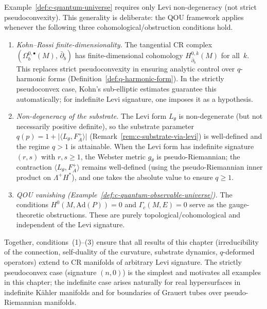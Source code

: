 \begin{remark}
\label{rem:levi-generalisation}
Example~\ref{def:c-quantum-universe} requires only Levi non-degeneracy
(not strict pseudoconvexity).  This generality is deliberate: the QOU
framework applies whenever the following three cohomological/obstruction
conditions hold.

\begin{enumerate}
  \item \emph{Kohn--Rossi finite-dimensionality.}\;
        The tangential CR complex
        $(\Omega^{0,\bullet}_b(M),\, \bar\partial_b)$ has
        finite-dimensional cohomology
        $H^{0,k}_{\bar\partial_b}(M)$ for all~$k$.  This replaces
        strict pseudoconvexity in ensuring analytic control over
        $q$-harmonic forms (Definition~\ref{def:q-harmonic-form}).
        In the strictly pseudoconvex case, Kohn's sub-elliptic
        estimates guarantee this automatically; for indefinite
        Levi signature, one imposes it as a hypothesis.
  \item \emph{Non-degeneracy of the substrate.}\;
        The Levi form $L_\theta$ is non-degenerate (but not necessarily
        positive definite), so the substrate parameter
        $q(p) = 1 + \lvert\langle L_\theta, F_A^+\rangle\rvert$
        (Remark~\ref{rem:c-substrate-via-levi}) is well-defined and
        the regime $q > 1$ is attainable.  When the Levi form has
        indefinite signature $(r,s)$ with $r,s \geq 1$, the Webster
        metric $g_\theta$ is pseudo-Riemannian; the contraction
        $\langle L_\theta, F_A^+\rangle$ remains well-defined (using
        the pseudo-Riemannian inner product on $\Lambda^+ H^*$), and
        one takes the absolute value to ensure $q \geq 1$.
  \item \emph{QOU vanishing (Example~\ref{def:c-quantum-observable-universe}).}\;
        The conditions $H^0(M, \mathrm{Ad}(P)) = 0$ and
        $\Gamma_c(M,E) = 0$ serve as the gauge-theoretic obstructions.
        These are purely topological/cohomological and independent of the
        Levi signature.
\end{enumerate}

\noindent
Together, conditions~(1)--(3) ensure that all results of this chapter
(irreducibility of the connection, self-duality of the curvature,
substrate dynamics, $q$-deformed operators) extend to CR manifolds of
arbitrary Levi signature.  The strictly pseudoconvex case (signature
$(n,0)$) is the simplest and motivates all examples in this chapter;
the indefinite case arises naturally for real hypersurfaces in
indefinite K\"ahler manifolds and for boundaries of
Grauert tubes over pseudo-Riemannian manifolds.
\end{remark}


